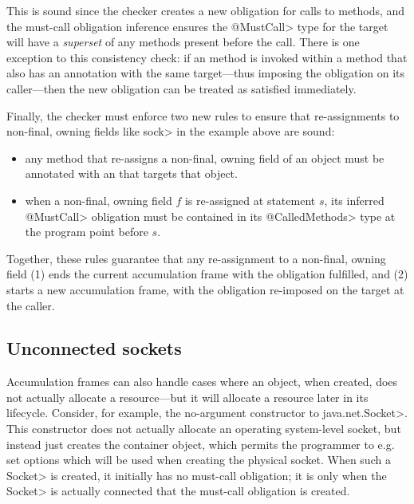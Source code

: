 This is sound since the checker creates a new obligation for calls to
\ResetMustCall methods, and the must-call obligation inference ensures the
\<@MustCall> type for the target will have a \emph{superset} of any methods present
before the call.
There is one exception to this consistency check: if an \ResetMustCall
method is invoked within a method that also has an \ResetMustCall annotation
with the same target---thus imposing the obligation on its caller---then
the new obligation can be treated as satisfied immediately.

Finally, the checker must enforce two new rules to ensure that
re-assignments to non-final, owning fields like \<sock> in the example
above are sound:
\begin{itemize}
\item any method that re-assigns a non-final, owning field of an object
  must be annotated with an \ResetMustCall that targets that object.
\item when a non-final, owning field $f$ is re-assigned at statement $s$, its inferred \<@MustCall> obligation
must be contained in its \<@CalledMethods> type at the program point before $s$.
\end{itemize}
\noindent
Together, these rules guarantee that any re-assignment to a non-final, owning
field (1) ends the current accumulation frame with the obligation fulfilled,
and (2) starts a new accumulation frame, with the obligation re-imposed on
the target at the caller.

\subsection{Unconnected sockets}
\label{sec:unconnected-sockets}
Accumulation frames can also handle cases where an object, when created,
does not actually allocate a resource---but it will allocate a resource
later in its lifecycle. Consider, for example, the no-argument constructor
to \<java.net.Socket>. This constructor does not actually allocate an
operating system-level socket, but instead just creates the container
object, which permits the programmer to e.g. set options which will be used
when creating the physical socket. When such a \<Socket> is created, it
initially has no must-call obligation; it is only when the \<Socket> is
actually connected that the must-call obligation is created.


